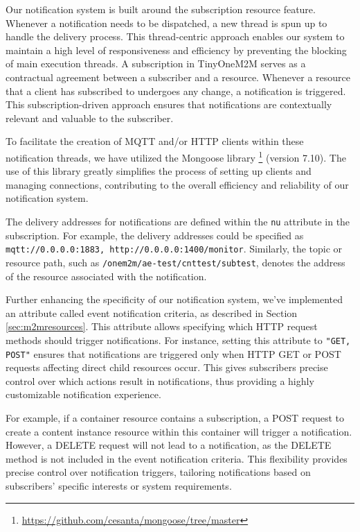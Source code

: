 \documentclass[a4paper,fleqn]{cas-dc}
\begin{document}
Our notification system is built around the subscription resource feature. Whenever a notification needs to be dispatched, a new thread is spun up to handle the delivery process. This thread-centric approach enables our system to maintain a high level of responsiveness and efficiency by preventing the blocking of main execution threads. A subscription in TinyOneM2M serves as a contractual agreement between a subscriber and a resource. Whenever a resource that a client has subscribed to undergoes any change, a notification is triggered. This subscription-driven approach ensures that notifications are contextually relevant and valuable to the subscriber.

To facilitate the creation of MQTT and/or HTTP clients within these notification threads, we have utilized the Mongoose library \footnote{\url{https://github.com/cesanta/mongoose/tree/master}} (version 7.10). The use of this library greatly simplifies the process of setting up clients and managing connections, contributing to the overall efficiency and reliability of our notification system.

The delivery addresses for notifications are defined within the \texttt{nu} attribute in the subscription. For example, the delivery addresses could be specified as \texttt{mqtt://0.0.0.0:1883, http://0.0.0.0:1400/monitor}. Similarly, the topic or resource path, such as \texttt{/onem2m/ae-test/cnttest/subtest}, denotes the address of the resource associated with the notification.

Further enhancing the specificity of our notification system, we've implemented an attribute called event notification criteria, as described in Section \ref{sec:m2mresources}. This attribute allows specifying which HTTP request methods should trigger notifications. For instance, setting this attribute to \texttt{"GET, POST"} ensures that notifications are triggered only when HTTP GET or POST requests affecting direct child resources occur. This gives subscribers precise control over which actions result in notifications, thus providing a highly customizable notification experience. 

For example, if a container resource contains a subscription, a POST request to create a content instance resource within this container will trigger a notification. However, a DELETE request will not lead to a notification, as the DELETE method is not included in the event notification criteria. This flexibility provides precise control over notification triggers, tailoring notifications based on subscribers' specific interests or system requirements.
\end{document}
